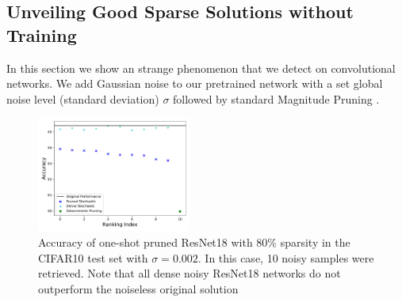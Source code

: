 
\subsection{Unveiling Good Sparse Solutions without Training}
In this section we show an strange phenomenon that we detect on convolutional networks.  
We add Gaussian noise to our pretrained network with a set global noise level
(standard deviation) $\sigma$ followed by standard Magnitude Pruning \cite{hanLearningBothWeights2015a,hanDeepCompressionCompressing2016a}. 
\begin{figure}
    \centering
    \includegraphics[width=0.45\textwidth]{figures/stochastic_deterministic_gaussian_sigma_0.002_pr_0.8_batchSize_512_pop_10_t_11-44_test.pdf}
    \caption{ Accuracy of one-shot pruned ResNet18 with 80\% sparsity in the CIFAR10 test set with $\sigma = 0.002$. In this case, 10 noisy samples were retrieved. Note that all dense noisy ResNet18 networks do not outperform the noiseless 
    original solution}
    \label{fig:stochastic_versus_deterministic}
\end{figure}

